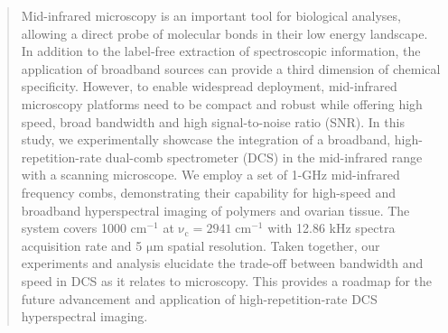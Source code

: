 \documentclass[aip,preprint]{revtex4-1}
\begin{document}
\author{Rohith Reddy}

\author{Scott A. Diddams}

\date{\today}%



\date{\today}

\begin{abstract}
Mid-infrared microscopy is an important tool for biological analyses, allowing a direct probe of molecular bonds in their low energy landscape. In addition to the label-free extraction of spectroscopic information, the application of broadband sources can provide a third dimension of chemical specificity. However, to enable widespread deployment, mid-infrared microscopy platforms need to be compact and robust while offering high speed, broad bandwidth and high signal-to-noise ratio (SNR). In this study, we experimentally showcase the integration of a broadband, high-repetition-rate dual-comb spectrometer (DCS) in the mid-infrared range with a scanning microscope. We employ a set of 1-GHz mid-infrared frequency combs, demonstrating their capability for high-speed and broadband hyperspectral imaging of polymers and ovarian tissue. The system covers 1000 $\mathrm{cm^{-1}}$ at \mbox{$\mathrm{\nu_c=2941 \; cm^{-1}}$} with 12.86 kHz spectra acquisition rate and 5 $\mathrm{\mu m}$ spatial resolution. Taken together, our experiments and analysis elucidate the trade-off between bandwidth and speed in DCS as it relates to microscopy. This provides a roadmap for the future advancement and application of high-repetition-rate DCS hyperspectral imaging.
\end{abstract}

\pacs{}%

\maketitle %
\end{document}
